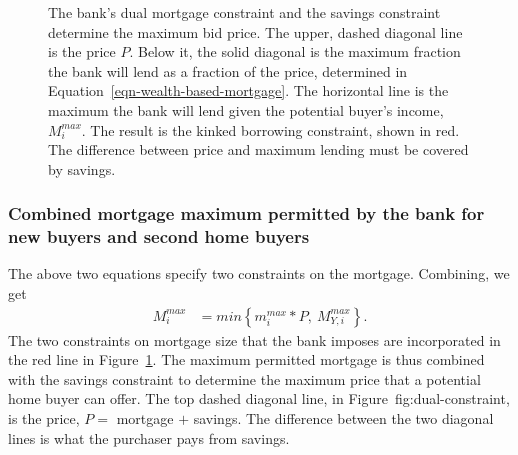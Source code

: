 {  \begin{figure}
    \centering
    
    \caption[The bank's dual mortgage constraint and the savings constraint]{The bank's dual mortgage constraint and the savings constraint determine the maximum bid price. The upper, dashed diagonal line is the price $P$. Below it, the solid diagonal is the maximum fraction the bank will lend as a fraction of the price, determined in Equation~\ref{eqn-wealth-based-mortgage}. The horizontal line is the maximum the bank will lend given the potential buyer's income, $M_i^{max}$. The result is the kinked borrowing constraint, shown in red. The difference between price and maximum lending must be covered by savings.}
    \label{fig:dual-constraint}
    \end{figure}

\subsubsection{Combined mortgage maximum permitted by the bank for new buyers and second home buyers}

The above two equations specify two constraints on the mortgage.  Combining, we get 
\begin{align} 
M_i^{max} &= min \left\{ m_i^{max}*P, \ M^{max}_{Y,i} \right\}. 
\label{eqn-max-mortgage-combined}
\end{align}
The two constraints on mortgage size that the bank imposes are incorporated in the red line in Figure~\ref{fig:dual-constraint}. The maximum permitted mortgage is thus combined with the savings constraint to determine the maximum price that a potential home buyer can offer. The top dashed diagonal line, in Figure~{fig:dual-constraint}, is the price, $P =$ mortgage $+$ savings. The difference between the two diagonal lines is what the purchaser pays from savings. %

}
